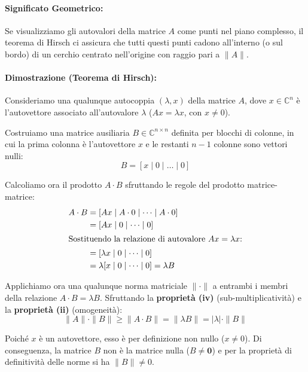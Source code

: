 \documentclass[a4paper,12pt]{article}
\begin{document}
	\paragraph{Significato Geometrico:}
	Se visualizziamo gli autovalori della matrice $A$ come punti nel piano complesso, il teorema di Hirsch ci assicura che tutti questi punti cadono all'interno (o sul bordo) di un cerchio centrato nell'origine con raggio pari a $\|A\|$.
	\paragraph{Dimostrazione (Teorema di Hirsch):}
	Consideriamo una qualunque autocoppia $(\lambda, x)$ della matrice $A$, dove $x \in \mathbb{C}^n$ è l'autovettore associato all'autovalore $\lambda$ ($Ax = \lambda x$, con $x \neq 0$).
	
	Costruiamo una matrice ausiliaria $B \in \mathbb{C}^{n \times n}$ definita per blocchi di colonne, in cui la prima colonna è l'autovettore $x$ e le restanti $n-1$ colonne sono vettori nulli:
	\begin{equation}
		B = [x \mid 0 \mid \dots \mid 0]
	\end{equation}
	
	Calcoliamo ora il prodotto $A \cdot B$ sfruttando le regole del prodotto matrice-matrice:
	\begin{align*}
		A \cdot B &= [Ax \mid A \cdot 0 \mid \dots \mid A \cdot 0] \\
		&= [Ax \mid 0 \mid \dots \mid 0] \\
		\intertext{Sostituendo la relazione di autovalore $Ax = \lambda x$:}
		&= [\lambda x \mid 0 \mid \dots \mid 0] \\
		&= \lambda [x \mid 0 \mid \dots \mid 0] = \lambda B
	\end{align*}
	
	Applichiamo ora una qualunque norma matriciale $\|\cdot\|$ a entrambi i membri della relazione $A \cdot B = \lambda B$. Sfruttando la \textbf{proprietà (iv)} (sub-multiplicatività) e la \textbf{proprietà (ii)} (omogeneità):
	\begin{equation}
		\|A\| \cdot \|B\| \ge \|A \cdot B\| = \|\lambda B\| = |\lambda| \cdot \|B\|
	\end{equation}
	
	Poiché $x$ è un autovettore, esso è per definizione non nullo ($x \neq 0$). Di conseguenza, la matrice $B$ non è la matrice nulla ($B \neq \mathbf{0}$) e per la proprietà di definitività delle norme si ha $\|B\| \neq 0$. 
	
\end{document}
